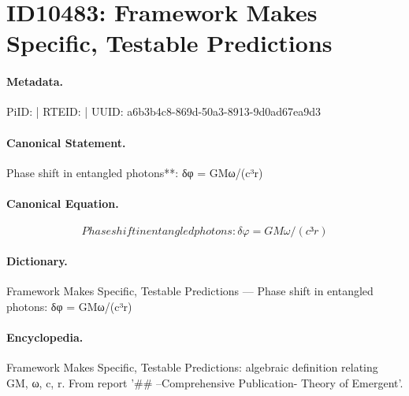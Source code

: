 \section*{ID10483: Framework Makes Specific, Testable Predictions}
\paragraph{Metadata.}
PiID:  | RTEID:  | UUID: a6b3b4c8-869d-50a3-8913-9d0ad67ea9d3

\paragraph{Canonical Statement.}
Phase shift in entangled photons**: δφ = GMω/(c³r)

\paragraph{Canonical Equation.}
\[
Phase shift in entangled photons: δφ = GMω/(c³r)
\]

\paragraph{Dictionary.}
Framework Makes Specific, Testable Predictions — Phase shift in entangled photons: δφ = GMω/(c³r)

\paragraph{Encyclopedia.}
Framework Makes Specific, Testable Predictions: algebraic definition relating GM, ω, c, r. From report '\#\# --Comprehensive Publication- Theory of Emergent'.
